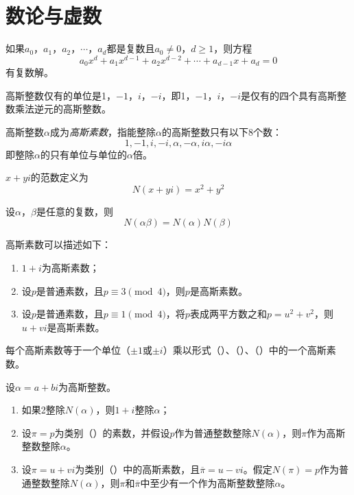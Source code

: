 \chapter{数论与虚数}
\begin{theorem}[代数学基本定理]
如果$a_0$，$a_1$，$a_2$，$\cdots$，$a_d$都是复数且$a_0\not=0$，$d\ge1$，则方程
\[a_0x^{d}+a_1x^{d-1}+a_2x^{d-2}+\cdots+a_{d-1}x + a_d=0\]
有复数解。
\end{theorem}
\begin{theorem}[高斯单位定理]
高斯整数仅有的单位是1，$-1$，$i$，$-i$，即1，$-1$，$i$，$-i$是仅有的四个具有高斯整数乘法逆元的高斯整数。
\end{theorem}
高斯整数$\alpha$成为\emph{高斯素数}，指能整除$\alpha$的高斯整数只有以下8个数：
\[1,-1,i,-i,\alpha,-\alpha,i\alpha,-i\alpha\]
即整除$\alpha$的只有单位与单位的$\alpha$倍。\par
$x+yi$的范数定义为
\[N(x+yi)=x^2+y^2\]
\begin{theorem}[范数的积性]
设$\alpha$，$\beta$是任意的复数，则
\[N(\alpha\beta)=N(\alpha)N(\beta)\]
\end{theorem}
\begin{theorem}[高斯素数定理]
高斯素数可以描述如下：
\begin{enumerate}
\renewcommand{\labelenumi}{(\roman{enumi})}
\item $1+i$为高斯素数；
\item 设$p$是普通素数，且$p\equiv3\pmod4$，则$p$是高斯素数。
\item 设$p$是普通素数，且$p\equiv1\pmod4$，将$p$表成两平方数之和$p=u^2+v^2$，则$u+vi$是高斯素数。
\end{enumerate}
每个高斯素数等于一个单位（$\pm1$或$\pm i$）乘以形式（）、（）、（）中的一个高斯素数。
\end{theorem}
\begin{lemma}[高斯整除性引理]
设$\alpha=a+bi$为高斯整数。
\begin{enumerate}
\renewcommand{\labelenumi}{(\alph{enumi})}
\item 如果2整除$N(\alpha)$，则$1+i$整除$\alpha$；
\item 设$\pi=p$为类别（）的素数，并假设$p$作为普通整数整除$N(\alpha)$，则$\pi$作为高斯整数整除$\alpha$。
\item 设$\pi=u+vi$为类别（）中的高斯素数，且$\overline\pi=u-vi$。假定$N(\pi)=p$作为普通整数整除$N(\alpha)$，则$\pi$和$\overline\pi$中至少有一个作为高斯整数整除$\alpha$。
\end{enumerate}
\end{lemma}
